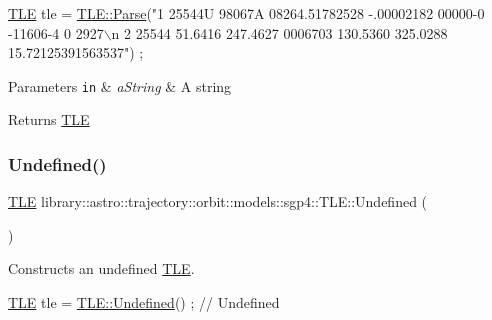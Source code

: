 \begin{DoxyCode}
\hyperlink{classlibrary_1_1astro_1_1trajectory_1_1orbit_1_1models_1_1sgp4_1_1_t_l_e_a4d2b43f02cef44f0c9635daf9946261c}{TLE} tle = \hyperlink{classlibrary_1_1astro_1_1trajectory_1_1orbit_1_1models_1_1sgp4_1_1_t_l_e_a842dce63b9adc35c1cb0e21d1777b3a5}{TLE::Parse}(\textcolor{stringliteral}{"1 25544U 98067A   08264.51782528 -.00002182  00000-0 -11606-4 0  2927\(\backslash\)n}
\textcolor{stringliteral}{                      2 25544  51.6416 247.4627 0006703 130.5360 325.0288 15.72125391563537"}) ;
\end{DoxyCode}



\begin{DoxyParams}[1]{Parameters}
\mbox{\tt in}  & {\em a\+String} & A string \\
\hline
\end{DoxyParams}
\begin{DoxyReturn}{Returns}
\hyperlink{classlibrary_1_1astro_1_1trajectory_1_1orbit_1_1models_1_1sgp4_1_1_t_l_e}{T\+LE} 
\end{DoxyReturn}
\mbox{\label{classlibrary_1_1astro_1_1trajectory_1_1orbit_1_1models_1_1sgp4_1_1_t_l_e_ac251783ddaeffea2f48f9cf0bf9aaf5e}} 
\subsubsection{\texorpdfstring{Undefined()}{Undefined()}}
{\footnotesize\ttfamily \hyperlink{classlibrary_1_1astro_1_1trajectory_1_1orbit_1_1models_1_1sgp4_1_1_t_l_e}{T\+LE} library\+::astro\+::trajectory\+::orbit\+::models\+::sgp4\+::\+T\+L\+E\+::\+Undefined (\begin{DoxyParamCaption}{ }\end{DoxyParamCaption})\hspace{0.3cm}{\ttfamily [static]}}



Constructs an undefined \hyperlink{classlibrary_1_1astro_1_1trajectory_1_1orbit_1_1models_1_1sgp4_1_1_t_l_e}{T\+LE}. 


\begin{DoxyCode}
\hyperlink{classlibrary_1_1astro_1_1trajectory_1_1orbit_1_1models_1_1sgp4_1_1_t_l_e_a4d2b43f02cef44f0c9635daf9946261c}{TLE} tle = \hyperlink{classlibrary_1_1astro_1_1trajectory_1_1orbit_1_1models_1_1sgp4_1_1_t_l_e_ac251783ddaeffea2f48f9cf0bf9aaf5e}{TLE::Undefined}() ; \textcolor{comment}{// Undefined}
\end{DoxyCode}


